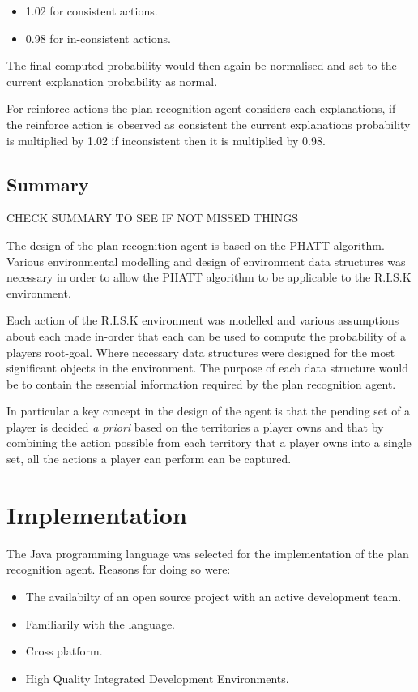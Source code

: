 \documentclass[parskip]{cs4rep}
\begin{document}
\begin{itemize}
\item
1.02 for consistent actions.
\item
0.98 for in-consistent actions.
\end{itemize}

The final computed probability would then again be normalised and set to the current explanation probability as normal.

For reinforce actions the plan recognition agent considers each explanations, if the reinforce action is observed as consistent the current explanations probability is multiplied by 1.02 if inconsistent then it is multiplied by 0.98. 

\section{Summary}

CHECK SUMMARY TO SEE IF NOT MISSED THINGS

The design of the plan recognition agent is based on the PHATT algorithm. Various environmental modelling and design of environment data structures was necessary in order to allow the PHATT algorithm to be applicable to the R.I.S.K environment. 

Each action of the R.I.S.K environment was modelled and various assumptions about each made in-order that each can be used to compute the probability of a players root-goal. Where necessary data structures were designed for the most significant objects in the environment. The purpose of each data structure would be to contain the essential information required by the plan recognition agent.

In particular a key concept in the design of the agent is that the pending set of a player is decided \textit{a priori} based on the territories a player owns and that by combining the action possible from each territory that a player owns into a single set, all the actions a player can perform can be captured.

\chapter{Implementation}

The Java programming language was selected for the implementation of the plan recognition agent. Reasons for doing so were:

\begin{itemize}
\item
The availabilty of an open source project with an active development team.
\item
Familiarily with the language.
\item
Cross platform.
\item
High Quality Integrated Development Environments.
\end{itemize}
\end{document}
